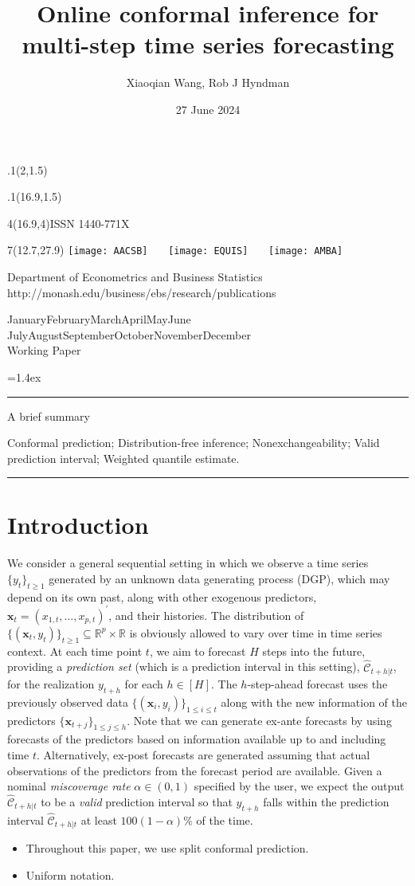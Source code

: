 \documentclass[
  11pt,
  a4paper,
]{article}
\title{Online conformal inference for multi-step time series
forecasting}
\date{27 June 2024}
\author{Xiaoqian Wang, Rob J Hyndman}
\makeatletter
\theoremstyle{plain}
\theoremstyle{plain}
\theoremstyle{remark}
\def\placefig#1#2#3#4{\begin{textblock}{.1}(#1,#2)\rlap{\texttt{[image: \#4]}}\end{textblock}}
\def\Date{\number\day}
\def\Month{\ifcase\month\or
 January\or February\or March\or April\or May\or June\or
 July\or August\or September\or October\or November\or December\fi}
\def\Year{\number\year}
\def\showjel{{\large\textsf{\textbf{JEL classification:}}~\@jel}}
\def\cover{{\sffamily\setcounter{page}{0}
        \thispagestyle{empty}
        \placefig{2}{1.5}{width=5cm}{monash2}
        \placefig{16.9}{1.5}{width=2.1cm}{MBSportrait}
        \begin{textblock}{4}(16.9,4)ISSN 1440-771X\end{textblock}
        \begin{textblock}{7}(12.7,27.9)\hfill
        \texttt{[image: AACSB]}~~~
        \texttt{[image: EQUIS]}~~~
        \texttt{[image: AMBA]}
        \end{textblock}
        \vspace*{2.5cm}
        \begin{center}\Large
        Department of Econometrics and Business Statistics\\[.5cm]
        \footnotesize http://monash.edu/business/ebs/research/publications
        \end{center}\vspace{2cm}
        \begin{center}
        \fbox{\parbox{14cm}{\begin{onehalfspace}\centering\Huge\vspace*{0.3cm}
                \textsf{\textbf{\expandafter{\@title}}}\vspace{1cm}\par
                \LARGE
                \expandafter{\@author}
                \end{onehalfspace}
        }}
        \end{center}
        \vfill
                \begin{center}\Large
                \Month~\Year\\[1cm]
                Working Paper \@wp
        \end{center}\vspace*{2cm}}}
\def\pageone{{\sffamily\setstretch{1}%
        \thispagestyle{empty}%
        \vbox to \textheight{%
        \raggedright\baselineskip=1.2cm
     {\fontsize{24.88}{30}\sffamily\textbf{\expandafter{\@title}}}
        \vspace{2cm}\par
        \hspace{1cm}\parbox{14cm}{\sffamily\large\@addresses}\vspace{1cm}\vfill
        \hspace{1cm}{\large\Date~\Month~\Year}\\[1cm]
        \hspace{1cm}\showjel\vss}}}
\def\blindtitle{{\sffamily
     \thispagestyle{plain}\raggedright\baselineskip=1.2cm
     {\fontsize{24.88}{30}\sffamily\textbf{\expandafter{\@title}}}\vspace{1cm}\par
        }}
\def\titlepage{{\cover\newpage\pageone\newpage\blindtitle}}
\let\maketitle\titlepage
\newenvironment{keywords}{\par\vspace{0.5cm}\noindent{\sffamily\textbf{Keywords:}}}{\vspace{0.25cm}\par\hrule\vspace{0.5cm}\par}
\renewenvironment{abstract}{\begin{minipage}{\textwidth}\parskip=1.4ex\noindent
\hrule\vspace{0.1cm}\par{\sffamily\textbf{\abstractname}}\newline\setstretch{1}}
  {\end{minipage}}
\makeatother
\begin{document}
\maketitle

\begin{abstract}
A brief summary
\end{abstract}

\begin{keywords}
  Conformal prediction; Distribution-free
inference; Nonexchangeability; Valid prediction interval; 
  Weighted quantile estimate.
\end{keywords}


\section{Introduction}\label{sec-intro}

We consider a general sequential setting in which we observe a time
series \(\{y_t\}_{t \geq 1}\) generated by an unknown data generating
process (DGP), which may depend on its own past, along with other
exogenous predictors, \(\bm{x}_t=(x_{1,t},\ldots,x_{p,t})^{\prime}\),
and their histories. The distribution of
\(\{(\bm{x}_t, y_t)\}_{t \geq 1} \subseteq \mathbb{R}^p \times \mathbb{R}\)
is obviously allowed to vary over time in time series context. At each
time point \(t\), we aim to forecast \(H\) steps into the future,
providing a \emph{prediction set} (which is a prediction interval in
this setting), \(\hat{\mathcal{C}}_{t+h|t}\), for the realization
\(y_{t+h}\) for each \(h\in[H]\). The \(h\)-step-ahead forecast uses the
previously observed data \(\{(\bm{x}_i, y_i)\}_{1 \leq i \leq t}\) along
with the new information of the predictors
\(\{\bm{x}_{t+j}\}_{1\leq j\leq h}\). Note that we can generate ex-ante
forecasts by using forecasts of the predictors based on information
available up to and including time \(t\). Alternatively, ex-post
forecasts are generated assuming that actual observations of the
predictors from the forecast period are available. Given a nominal
\emph{miscoverage rate} \(\alpha \in (0,1)\) specified by the user, we
expect the output \(\hat{\mathcal{C}}_{t+h|t}\) to be a \emph{valid}
prediction interval so that \(y_{t+h}\) falls within the prediction
interval \(\hat{\mathcal{C}}_{t+h|t}\) at least \(100(1-\alpha)\%\) of
the time.

\begin{itemize}
\item
  Throughout this paper, we use split conformal prediction.
\item
  Uniform notation.
\end{itemize}
\end{document}
